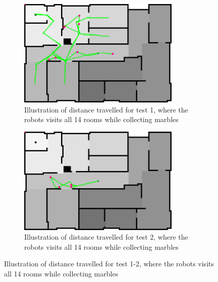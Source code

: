 \documentclass[../Head/Main.tex]{subfiles}
\begin{document}
\begin{figure}[H]
\begin{subfigure}[b]{0.49\textwidth}
    \centering
    \includegraphics[width=0.85\textwidth]{../Figures/Modelbased/brushfireMarble1}
    \caption{Illustration of distance travelled for test 1, where the robots visits all 14 rooms while collecting marbles}
    \label{fig:Marble1}
  \end{subfigure}
  \hfill
  \begin{subfigure}[b]{0.49\textwidth}
    \centering
    \includegraphics[width=0.85\textwidth]{../Figures/Modelbased/brushfireMarble2}
    \caption{Illustration of distance travelled for test 2, where the robots visits all 14 rooms while collecting marbles}
    \label{fig:Marble2}
  \end{subfigure}
  \caption{Illustration of distance travelled for test 1-2, where the robots visits all 14 rooms while collecting marbles}
\end{figure}
\end{document}
